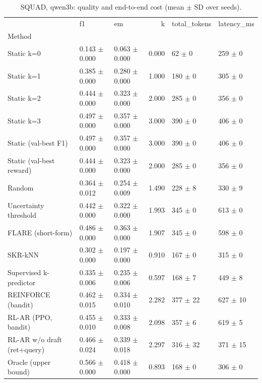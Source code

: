 \begin{table}
\caption{SQUAD, qwen3b: quality and end-to-end cost (mean $\pm$ SD over seeds).}
\begin{tabular}{lllrll}
\toprule
 & f1 & em & k & total_tokens & latency_ms \\
Method &  &  &  &  &  \\
\midrule
Static k=0 & 0.143 $\pm$ 0.000 & 0.063 $\pm$ 0.000 & 0.000 & 62 $\pm$ 0 & 259 $\pm$ 0 \\
Static k=1 & 0.385 $\pm$ 0.000 & 0.280 $\pm$ 0.000 & 1.000 & 180 $\pm$ 0 & 305 $\pm$ 0 \\
Static k=2 & 0.444 $\pm$ 0.000 & 0.323 $\pm$ 0.000 & 2.000 & 285 $\pm$ 0 & 356 $\pm$ 0 \\
Static k=3 & 0.497 $\pm$ 0.000 & 0.357 $\pm$ 0.000 & 3.000 & 390 $\pm$ 0 & 406 $\pm$ 0 \\
Static (val-best F1) & 0.497 $\pm$ 0.000 & 0.357 $\pm$ 0.000 & 3.000 & 390 $\pm$ 0 & 406 $\pm$ 0 \\
Static (val-best reward) & 0.444 $\pm$ 0.000 & 0.323 $\pm$ 0.000 & 2.000 & 285 $\pm$ 0 & 356 $\pm$ 0 \\
Random & 0.364 $\pm$ 0.012 & 0.254 $\pm$ 0.009 & 1.490 & 228 $\pm$ 8 & 330 $\pm$ 9 \\
Uncertainty threshold & 0.442 $\pm$ 0.000 & 0.322 $\pm$ 0.000 & 1.993 & 345 $\pm$ 0 & 613 $\pm$ 0 \\
FLARE (short-form) & 0.486 $\pm$ 0.000 & 0.363 $\pm$ 0.000 & 1.907 & 345 $\pm$ 0 & 598 $\pm$ 0 \\
SKR-kNN & 0.302 $\pm$ 0.000 & 0.197 $\pm$ 0.000 & 0.910 & 167 $\pm$ 0 & 315 $\pm$ 0 \\
Supervised k-predictor & 0.335 $\pm$ 0.006 & 0.235 $\pm$ 0.006 & 0.597 & 168 $\pm$ 7 & 449 $\pm$ 8 \\
REINFORCE (bandit) & 0.462 $\pm$ 0.015 & 0.334 $\pm$ 0.010 & 2.282 & 377 $\pm$ 22 & 627 $\pm$ 10 \\
RL-AR (PPO, bandit) & 0.455 $\pm$ 0.010 & 0.333 $\pm$ 0.008 & 2.098 & 357 $\pm$ 6 & 619 $\pm$ 5 \\
RL-AR w/o draft (ret+query) & 0.466 $\pm$ 0.024 & 0.339 $\pm$ 0.018 & 2.297 & 316 $\pm$ 32 & 371 $\pm$ 15 \\
Oracle (upper bound) & 0.566 $\pm$ 0.000 & 0.418 $\pm$ 0.000 & 0.893 & 168 $\pm$ 0 & 306 $\pm$ 0 \\
\bottomrule
\end{tabular}
\end{table}
